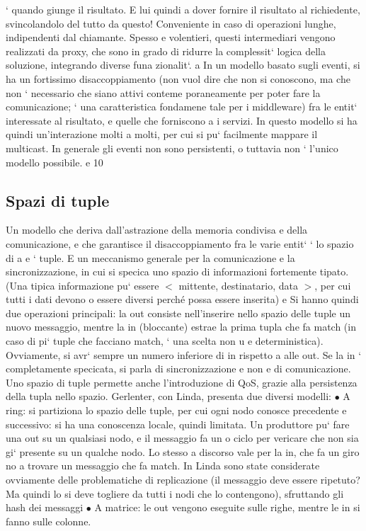 \documentclass[a4paper,12pt]{article}
\begin{document}
`
quando giunge il risultato. E lui quindi a dover fornire il risultato al
richiedente, svincolandolo del tutto da questo! Conveniente in caso di
operazioni lunghe, indipendenti dal chiamante.
Spesso e volentieri, questi intermediari vengono realizzati da proxy, che sono in
grado di ridurre la complessit` logica della soluzione, integrando diverse funa
zionalit`.
a
In un modello basato sugli eventi, si ha un fortissimo disaccoppiamento (non
vuol dire che non si conoscono, ma che non ` necessario che siano attivi conteme
poraneamente per poter fare la comunicazione; ` una caratteristica fondamene
tale per i middleware) fra le entit` interessate al risultato, e quelle che forniscono
a
i servizi. In questo modello si ha quindi un'interazione molti a molti, per cui si
pu` facilmente mappare il multicast. In generale gli eventi non sono persistenti,
o
tuttavia non ` l'unico modello possibile.
e
10
\subsection{Spazi di tuple}
Un modello che deriva dall'astrazione della memoria condivisa e della comunicazione, e che garantisce il
disaccoppiamento fra le varie entit` ` lo spazio di
a e
`
tuple. E un meccanismo generale per la comunicazione e la sincronizzazione, in
cui si specica uno spazio di informazioni fortemente tipato. (Una tipica informazione pu` essere $<$ mittente,
destinatario, data $>$, per cui tutti i dati devono
o
essere diversi perché possa essere inserita)
e
Si hanno quindi due operazioni principali: la out consiste nell'inserire nello
spazio delle tuple un nuovo messaggio, mentre la in (bloccante) estrae la prima
tupla che fa match (in caso di pi` tuple che facciano match, ` una scelta non
u
e
deterministica). Ovviamente, si avr` sempre un numero inferiore di in rispetto
a
alle out. Se la in ` completamente specicata, si parla di sincronizzazione e non
e
di comunicazione. Uno spazio di tuple permette anche l'introduzione di QoS,
grazie alla persistenza della tupla nello spazio.
Gerlenter, con Linda, presenta due diversi modelli:
$\bullet$ A ring: si partiziona lo spazio delle tuple, per cui ogni nodo conosce
precedente e successivo: si ha una conoscenza locale, quindi limitata. Un
produttore pu` fare una out su un qualsiasi nodo, e il messaggio fa un
o
ciclo per vericare che non sia gi` presente su un qualche nodo. Lo stesso
a
discorso vale per la in, che fa un giro no a trovare un messaggio che fa
match. In Linda sono state considerate ovviamente delle problematiche
di replicazione (il messaggio deve essere ripetuto? Ma quindi lo si deve
togliere da tutti i nodi che lo contengono), sfruttando gli hash dei messaggi
$\bullet$ A matrice: le out vengono eseguite sulle righe, mentre le in si fanno sulle
colonne.
\end{document}
